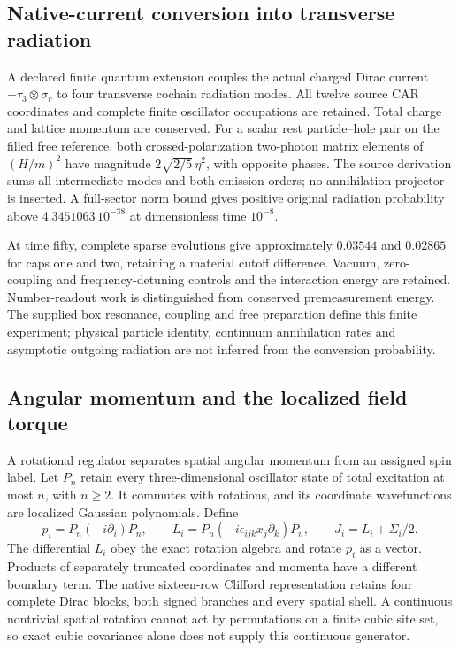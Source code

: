 \subsection{Native-current conversion into transverse radiation}
A declared finite quantum extension couples the actual charged Dirac current
$-\tau_3\otimes\sigma_r$ to four transverse cochain radiation modes.
All twelve source CAR coordinates and complete finite oscillator occupations
are retained. Total charge and lattice momentum are conserved. For a scalar
rest particle--hole pair on the filled free reference, both crossed-polarization
two-photon matrix elements of $(H/m)^2$ have magnitude
$2\sqrt{2/5}\,\eta^2$, with opposite phases. The source derivation sums
all intermediate modes and both emission orders; no annihilation projector
is inserted. A full-sector norm bound gives positive original radiation
probability above $4.3451063\,10^{-38}$ at dimensionless time $10^{-8}$.

At time fifty, complete sparse evolutions give approximately $0.03544$
and $0.02865$ for caps one and two, retaining a material cutoff difference.
Vacuum, zero-coupling and frequency-detuning controls and the interaction
energy are retained. Number-readout work is distinguished from conserved
premeasurement energy. The supplied box resonance, coupling and free
preparation define this finite experiment; physical particle identity,
continuum annihilation rates and asymptotic outgoing radiation are not
inferred from the conversion probability.

\subsection{Angular momentum and the localized field torque}

A rotational regulator separates spatial angular momentum from an
assigned spin label. Let $P_n$ retain every three-dimensional oscillator
state of total excitation at most $n$, with $n\ge2$. It commutes with
rotations, and its coordinate wavefunctions are localized Gaussian
polynomials. Define
\[
 p_i=P_n(-i\partial_i)P_n,\qquad
 L_i=P_n(-i\epsilon_{ijk}x_j\partial_k)P_n,\qquad
 J_i=L_i+\Sigma_i/2.
\]
The differential $L_i$ obey the exact rotation algebra and rotate $p_i$ as
a vector. Products of separately truncated coordinates and momenta have a
different boundary term. The native sixteen-row Clifford representation
retains four complete Dirac blocks, both signed branches and every spatial
shell. A continuous nontrivial spatial rotation cannot act by permutations
on a finite cubic site set, so exact cubic covariance alone does not
supply this continuous generator.

